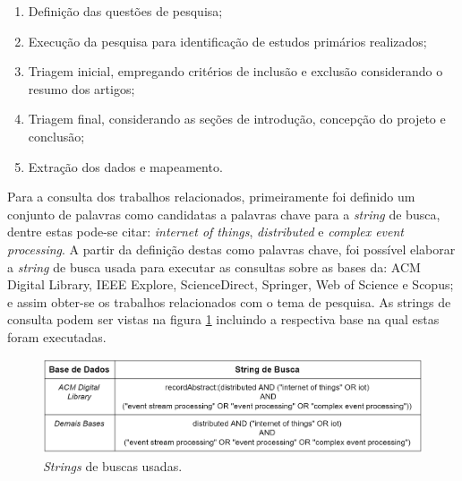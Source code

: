 \documentclass[ti,table]{texufpel} %
\begin{document}
\begin{enumerate} 

    \item Definição das questões de pesquisa; 

    \item Execução da pesquisa para identificação de estudos primários realizados; 

    \item Triagem inicial, empregando critérios de inclusão e exclusão considerando o resumo dos artigos; 

    \item Triagem final, considerando as seções de introdução, concepção do projeto e conclusão; 

    \item Extração dos dados e mapeamento. 

     

  

\end{enumerate}   

  

Para a consulta dos trabalhos relacionados, primeiramente foi definido um conjunto de palavras como candidatas a palavras chave para a \textit{string} de busca, dentre estas pode-se citar: \textit{internet of things}, \textit{distributed} e \textit{complex event processing}. A partir da definição destas como palavras chave, foi possível elaborar a \textit{string} de busca usada para executar as consultas sobre as bases da: ACM Digital Library, IEEE Explore, ScienceDirect, Springer, Web of Science e Scopus; e assim obter-se os trabalhos relacionados com o tema de pesquisa. As strings de consulta podem ser vistas na figura \ref{tab:stringBusca} incluindo a respectiva base na qual estas foram executadas. 

  

  

  

\begin{figure}[ht] 

    \centering 

    \includegraphics[width=1\textwidth]{imagens/tabela_string_busca.png} 

    \caption{\textit{Strings} de buscas usadas.} 

    \label{tab:stringBusca} 

\end{figure} 
\end{document}
